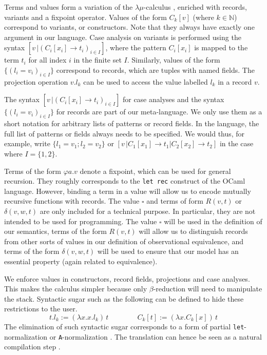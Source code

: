 Terms and values form a variation of the $λμ$-calculus \cite{Parigot1992},
enriched with records, variants and a fixpoint operator. Values of the form
$C_k[v]$ (where $k ∈ \mathbb{N}$) correspond to variants, or constructors.
Note that they always have exactly one argument in our language. Case analysis
on variants is performed using the syntax $[v\,| (C_i[x_i] → t_i)_{i∈I}]$,
where the pattern $C_i[x_i]$ is mapped to the term $t_i$ for all index $i$ in
the finite set $I$. Similarly, values of the form $\{(l_i = v_i)_{i∈I}\}$
correspond to records, which are tuples with named fields. The projection
operation $v.l_k$ can be used to access the value labelled $l_k$ in a record
$v$.
\begin{remark}
  The syntax $[v\,| (C_i[x_i] → t_i)_{i∈I}]$ for case analyses and the syntax
  $\{(l_i = v_i)_{i∈I}\}$ for records are part of our meta-language. We only
  use them as a short notation for arbitrary lists of patterns or record
  fields. In the language, the full list of patterns or fields always needs
  to be specified. We would thus, for example, write $\{l_1=v_1; l_2=v_2\}$ or
  $[v\,| C_1[x_1] → t_1 | C_2[x_2] → t_2]$ in the case where $I = \{1, 2\}$.
\end{remark}
Terms of the form $φa.v$ denote a fixpoint, which can be used for general
recursion. They roughly corresponds to the \verb#let rec# construct of the
OCaml language. However, binding a term in a value will allow us to encode
mutually recursive functions with records.
%
The value $\square$ and terms of form $R(v,t)$ or $δ(v,w,t)$ are only
included for a technical purpose. In particular, they are not intended
to be used for programming. The value $\square$ will be used in the
definition of our semantics, terms of the form $R(v,t)$ will allow us
to distinguish records from other sorts of values in our definition of
observational equivalence, and terms of the form $δ(v,w,t)$ will be
used to ensure that our model has an essential property (again related
to equivalence).

\begin{remark}
  We enforce values in constructors, record fields, projections and case
  analyses. This makes the calculus simpler because only $β$-reduction
  will need to manipulate the stack. Syntactic sugar such as the following
  can be defined to hide these restrictions to the user.
  $$
    t.l_k := (λx.x.l_k)\,t
    \quad\quad\quad\quad
    C_k[t] := (λx.C_k[x])\,t
  $$
  The elimination of such syntactic sugar corresponds to a form of partial
  \verb#let#-normalization \cite{Moggi1989} or \verb#A#-normalization
  \cite{Flanagan1993}. The translation can hence be seen as a natural
  compilation step \cite{Tarditi1996, Chlipala2005}.
\end{remark}

